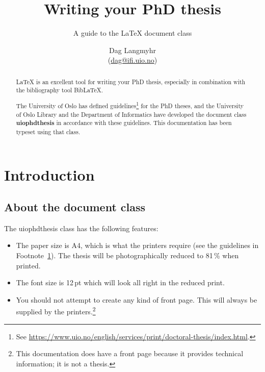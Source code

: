 \documentclass[UKenglish]{uiophdthesis}
\title{Writing your PhD thesis}
\subtitle{A guide to the \LaTeX{} document class \pb{uiophdthesis}}
\author{Dag Langmyhr\\ (\url{dag@ifi.uio.no})}
\newcommand{\p}[1]{\textsf{#1}}
\newcommand{\pb}[1]{\textbf{\p{#1}}}
\begin{document}
\uiomasterfp[kind=Documentation, compact, nosp, colour=grey, date=\today]

\begin{abstract}
\LaTeX{} is an excellent tool for writing your PhD thesis, especially in
combination with the bibliography tool Bib\LaTeX.

The University of Oslo has defined guidelines\footnote{\label{guidelines}See
  \url{https://www.uio.no/english/services/print/doctoral-thesis/index.html}.}
for the PhD theses, and 
the University of Oslo Library and the Department of Informatics have
developed the document class \pb{uiophdthesis} in accordance with these
guidelines. This documentation has been typeset using that class.
\end{abstract}

\tableofcontents

\part*{Introduction}

\chapter{About the document class}
The \p{uiophdthesis} class has the following features:
\begin{itemize}
\item The paper size is A4, which is what the printers require (see
  the guidelines in Footnote~\ref{guidelines}).
  The thesis will be photographically reduced to
  81\,\% when printed.

\item The font size is 12\,pt which will look all right in the reduced
  print.

\item You should not attempt to create any kind of front page. This
  will always be supplied by the printers.\footnote{This documentation
    does have a front page because it provides technical information;
    it is not a thesis.}
\end{itemize}
\end{document}
